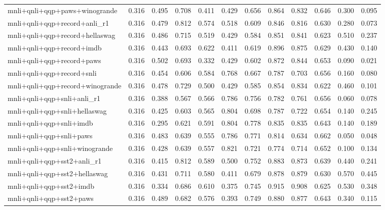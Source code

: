 \begin{table}[t]
\begin{tabular}{lrrrrrrrrrrr}
    mnli+qnli+qqp+paws+winogrande & 0.316 & 0.495 & 0.708 & 0.411 & 0.429 & 0.656 & 0.864 & 0.832 & 0.646 & 0.300 & 0.095 \\
    mnli+qnli+qqp+record+anli\_r1 & 0.316 & 0.479 & 0.812 & 0.574 & 0.518 & 0.609 & 0.846 & 0.816 & 0.630 & 0.280 & 0.073 \\
    mnli+qnli+qqp+record+hellaswag & 0.316 & 0.486 & 0.715 & 0.519 & 0.429 & 0.584 & 0.851 & 0.841 & 0.623 & 0.510 & 0.237 \\
    mnli+qnli+qqp+record+imdb & 0.316 & 0.443 & 0.693 & 0.622 & 0.411 & 0.619 & 0.896 & 0.875 & 0.629 & 0.430 & 0.140 \\
    mnli+qnli+qqp+record+paws & 0.316 & 0.502 & 0.693 & 0.332 & 0.429 & 0.602 & 0.872 & 0.844 & 0.653 & 0.090 & 0.021 \\
    mnli+qnli+qqp+record+snli & 0.316 & 0.454 & 0.606 & 0.584 & 0.768 & 0.667 & 0.787 & 0.703 & 0.656 & 0.160 & 0.080 \\
    mnli+qnli+qqp+record+winogrande & 0.316 & 0.478 & 0.729 & 0.500 & 0.429 & 0.585 & 0.854 & 0.834 & 0.622 & 0.460 & 0.101 \\
    mnli+qnli+qqp+snli+anli\_r1 & 0.316 & 0.388 & 0.567 & 0.566 & 0.786 & 0.756 & 0.782 & 0.761 & 0.656 & 0.060 & 0.078 \\
    mnli+qnli+qqp+snli+hellaswag & 0.316 & 0.425 & 0.603 & 0.565 & 0.804 & 0.698 & 0.787 & 0.722 & 0.654 & 0.140 & 0.245 \\
    mnli+qnli+qqp+snli+imdb & 0.316 & 0.295 & 0.621 & 0.591 & 0.804 & 0.778 & 0.835 & 0.835 & 0.643 & 0.140 & 0.189 \\
    mnli+qnli+qqp+snli+paws & 0.316 & 0.483 & 0.639 & 0.555 & 0.786 & 0.771 & 0.814 & 0.634 & 0.662 & 0.050 & 0.048 \\
    mnli+qnli+qqp+snli+winogrande & 0.316 & 0.428 & 0.639 & 0.557 & 0.821 & 0.721 & 0.774 & 0.714 & 0.652 & 0.100 & 0.134 \\
    mnli+qnli+qqp+sst2+anli\_r1 & 0.316 & 0.415 & 0.812 & 0.589 & 0.500 & 0.752 & 0.883 & 0.873 & 0.639 & 0.440 & 0.241 \\
    mnli+qnli+qqp+sst2+hellaswag & 0.316 & 0.431 & 0.711 & 0.580 & 0.411 & 0.679 & 0.878 & 0.879 & 0.630 & 0.570 & 0.445 \\
    mnli+qnli+qqp+sst2+imdb & 0.316 & 0.334 & 0.686 & 0.610 & 0.375 & 0.745 & 0.915 & 0.908 & 0.625 & 0.530 & 0.348 \\
    mnli+qnli+qqp+sst2+paws & 0.316 & 0.489 & 0.682 & 0.576 & 0.393 & 0.749 & 0.880 & 0.877 & 0.643 & 0.340 & 0.115 \\

\end{tabular}
\end{table}
